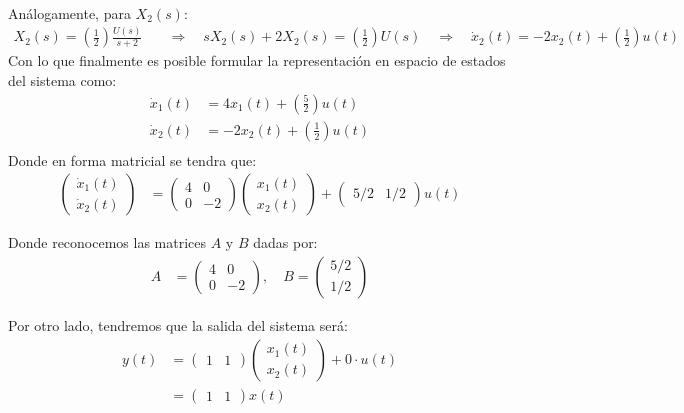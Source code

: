 \documentclass[
  11pt,
  letterpaper,
   addpoints,
   answers
  ]{exam}
\begin{document}
\begin{questions}
\begin{solution}
\begin{align}
\end{align}
Análogamente, para $X_2(s)$:
\begin{align}
  X_2(s) = \left(\frac{1}{2}\right)\frac{U(s)}{s+2} \quad &\Longrightarrow \quad sX_2(s) + 2X_2(s) = \left(\frac{1}{2}\right)U(s) \quad \Longrightarrow \quad \dot{x}_2(t) = -2x_2(t) + \left(\frac{1}{2}\right)u(t)
\end{align}
Con lo que finalmente es posible formular la representación en espacio de estados del sistema como:
\begin{align}
  \dot{x}_1(t) &= 4x_1(t) + \left(\frac{5}{2}\right)u(t) \\
  \dot{x}_2(t) &= -2x_2(t) + \left(\frac{1}{2}\right)u(t) \\
\end{align}
Donde en forma matricial se tendra que:
\begin{align}
  \begin{pmatrix}
    \dot{x}_1(t) \\ \dot{x}_2(t)
  \end{pmatrix}
  &=
  \begin{pmatrix}
    4 & 0 \\
    0 & -2
  \end{pmatrix}
  \begin{pmatrix}
    x_1(t) \\ x_2(t)
  \end{pmatrix}
  +
  \begin{pmatrix}
   5/2 & 1/2
  \end{pmatrix}
  u(t) 
\end{align}

Donde reconocemos las matrices $A$ y $B$ dadas por:
\begin{align}
  A &= \begin{pmatrix}
    4 & 0 \\
    0 & -2
  \end{pmatrix}, \quad
  B = \begin{pmatrix}
    5/2 \\ 1/2
  \end{pmatrix}
\end{align}

Por otro lado, tendremos que la salida del sistema será:
\begin{align}
  y(t) &= \begin{pmatrix} 1 & 1 \end{pmatrix} \begin{pmatrix} x_1(t) \\ x_2(t) \end{pmatrix} + 0 \cdot u(t) \\
  &= \begin{pmatrix} 1 & 1 \end{pmatrix} x(t) 
\end{align}
  


\end{solution}
\end{questions}
\end{document}
